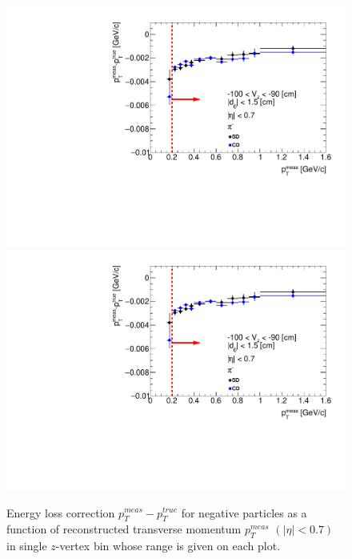 \begin{figure}[H]
\caption[Energy loss correction for negative particles as a function of reconstructed transverse momentum $p_T^{meas}$.]{Energy loss correction $p_T^{meas}-p_T^{true}$ for negative particles as a function of reconstructed transverse momentum $p_T^{meas}$ $\left(|\eta|<0.7\right)$ in single $z$-vertex bin whose range is given on each plot.}\label{fig:energyLossPrimaryNegative}
\parbox{0.329\textwidth}{
  \includegraphics[width=\linewidth,page=123]{graphics/energyLoss/energyLoss3D_OnePrtAlso.pdf}\\
  \includegraphics[width=\linewidth,page=126]{graphics/energyLoss/energyLoss3D_OnePrtAlso.pdf}\\
}
\end{figure}
